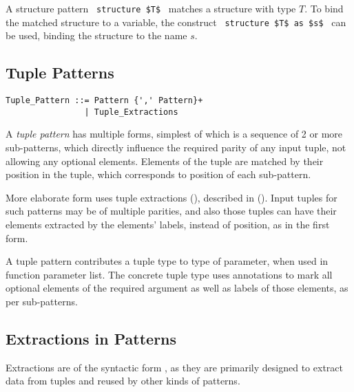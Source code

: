 A structure pattern ~\lstinline!structure $T$!~ matches a structure with type $T$. To bind the matched structure to a variable, the construct ~\lstinline!structure $T$ as $s$!~ can be used, binding the structure to the name $s$. 










\subsection{Tuple Patterns}
\label{sec:tuple-patterns}

\grammar\begin{lstlisting}
Tuple_Pattern ::= Pattern {',' Pattern}+
                | Tuple_Extractions
\end{lstlisting}

A {\em tuple pattern} has multiple forms, simplest of which is a sequence of 2 or more sub-patterns, which directly influence the required parity of any input tuple, not allowing any optional elements. Elements of the tuple are matched by their position in the tuple, which corresponds to position of each sub-pattern. 

More elaborate form uses tuple extractions (), described in (). Input tuples for such patterns may be of multiple parities, and also those tuples can have their elements extracted by the elements' labels, instead of position, as in the first form. 

A tuple pattern contributes a tuple type to type of parameter, when used in function parameter list. The concrete tuple type uses annotations to mark all optional elements of the required argument as well as labels of those elements, as per sub-patterns. 





\subsection{Extractions in Patterns}
\label{sec:extractions-in-patterns}

Extractions are of the syntactic form , as they are primarily designed to extract data from tuples and reused by other kinds of patterns. 

